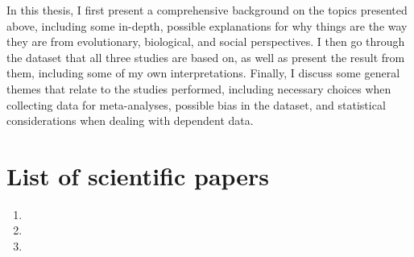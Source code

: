 ﻿\documentclass[12pt,twoside,]{article}
\begin{document}
In this thesis, I first present a comprehensive background on the topics presented above, including some in-depth, possible explanations for why things are the way they are from evolutionary, biological, and social perspectives. I then go through the dataset that all three studies are based on, as well as present the result from them, including some of my own interpretations. Finally, I discuss some general themes that relate to the studies performed, including necessary choices when collecting data for meta-analyses, possible bias in the dataset, and statistical considerations when dealing with dependent data.

\newpage
\thispagestyle{empty}
\section*{List of scientific papers}
\begin{enumerate}[label=\Roman*.]
	\item {}
  \item {}
  \item {}
\end{enumerate}

\newpage
{\textsc{\tableofcontents}}
\thispagestyle{empty} %

\newpage
{}
\setcounter{page}{1}



\FloatBarrier
\printbibliography
\end{document}
